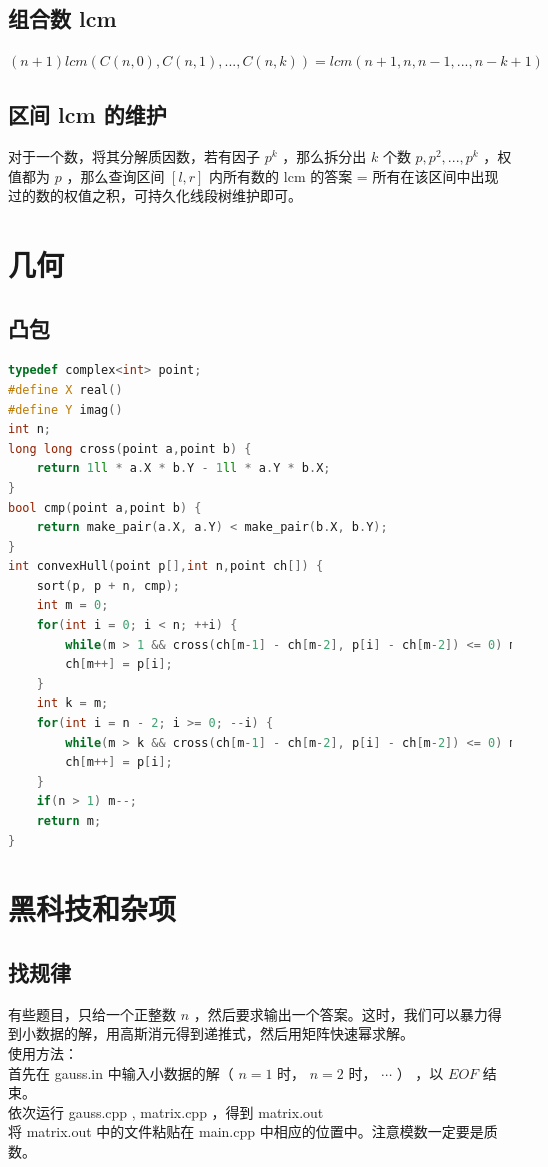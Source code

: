 \documentclass{article}
\begin{document}
\subsection{组合数 lcm}
$(n+1) lcm(C(n, 0), C(n,1),...,C(n,k)) = lcm(n+1, n, n-1, ..., n-k+1)$
\subsection{区间 lcm 的维护}
对于一个数，将其分解质因数，若有因子 $p^k$ ，那么拆分出 $k$ 个数 $p, p^2, ..., p^k$ ，权值都为 $p$ ，那么查询区间 $[l, r]$ 内所有数的 lcm 的答案 = 所有在该区间中出现过的数的权值之积，可持久化线段树维护即可。
\newpage
\section{几何}
\subsection{凸包}
\begin{lstlisting}[language=C++]
typedef complex<int> point;
#define X real()
#define Y imag()
int n;
long long cross(point a,point b) {
	return 1ll * a.X * b.Y - 1ll * a.Y * b.X;
}
bool cmp(point a,point b) {
	return make_pair(a.X, a.Y) < make_pair(b.X, b.Y);
}
int convexHull(point p[],int n,point ch[]) {
	sort(p, p + n, cmp);
	int m = 0;
	for(int i = 0; i < n; ++i) {
		while(m > 1 && cross(ch[m-1] - ch[m-2], p[i] - ch[m-2]) <= 0) m--;
		ch[m++] = p[i];
	}
	int k = m;
	for(int i = n - 2; i >= 0; --i) {
		while(m > k && cross(ch[m-1] - ch[m-2], p[i] - ch[m-2]) <= 0) m--;
		ch[m++] = p[i];
	}
	if(n > 1) m--;
	return m;
}
\end{lstlisting}
\section{黑科技和杂项}
\subsection{找规律}
有些题目，只给一个正整数 $n$ ，然后要求输出一个答案。这时，我们可以暴力得到小数据的解，用高斯消元得到递推式，然后用矩阵快速幂求解。\\
使用方法： \\
首先在 gauss.in 中输入小数据的解（ $n = 1$ 时， $n = 2$ 时， $\cdots$ ） ，以 $EOF$ 结束。 \\
依次运行 gauss.cpp , matrix.cpp ，得到 matrix.out \\
将 matrix.out 中的文件粘贴在 main.cpp 中相应的位置中。注意模数一定要是质数。\\
\end{document}
